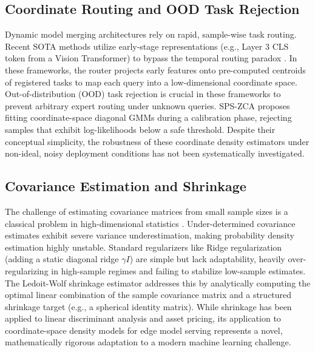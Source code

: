 \subsection{Coordinate Routing and OOD Task Rejection}
Dynamic model merging architectures rely on rapid, sample-wise task routing. Recent SOTA methods utilize early-stage representations (e.g., Layer 3 CLS token from a Vision Transformer) to bypass the temporal routing paradox \cite{pfsr2025, mbh2025}. In these frameworks, the router projects early features onto pre-computed centroids of registered tasks to map each query into a low-dimensional coordinate space. Out-of-distribution (OOD) task rejection is crucial in these frameworks to prevent arbitrary expert routing under unknown queries. SPS-ZCA \cite{pfsr2025} proposes fitting coordinate-space diagonal GMMs during a calibration phase, rejecting samples that exhibit log-likelihoods below a safe threshold. Despite their conceptual simplicity, the robustness of these coordinate density estimators under non-ideal, noisy deployment conditions has not been systematically investigated.

\subsection{Covariance Estimation and Shrinkage}
The challenge of estimating covariance matrices from small sample sizes is a classical problem in high-dimensional statistics \cite{ledoit2004well}. Under-determined covariance estimates exhibit severe variance underestimation, making probability density estimation highly unstable. Standard regularizers like Ridge regularization (adding a static diagonal ridge $\gamma I$) are simple but lack adaptability, heavily over-regularizing in high-sample regimes and failing to stabilize low-sample estimates. The Ledoit-Wolf shrinkage estimator \cite{ledoit2004well} addresses this by analytically computing the optimal linear combination of the sample covariance matrix and a structured shrinkage target (e.g., a spherical identity matrix). While shrinkage has been applied to linear discriminant analysis and asset pricing, its application to coordinate-space density models for edge model serving represents a novel, mathematically rigorous adaptation to a modern machine learning challenge.

